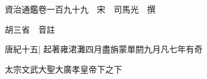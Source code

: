 






























































資治通鑑卷一百九十九　宋　司馬光　撰

胡三省　音註

唐紀十五|{
	起著雍涒灘四月盡旃蒙單閼九月凡七年有奇}


太宗文武大聖大廣孝皇帝下之下

